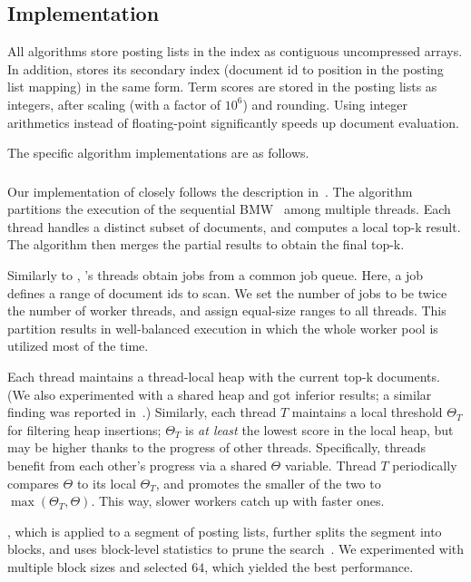 \subsection{Implementation}
\label{ssec:implementation}

All algorithms store posting lists in the index as contiguous uncompressed arrays. In addition, {\pRA} stores 
its secondary index (document id to position in the posting list mapping) in the same form. 
Term scores are stored in the posting lists as integers, after scaling (with a factor of $10^6$) and rounding. 
Using integer arithmetics instead of floating-point significantly speeds up document evaluation. 

The specific algorithm implementations are as follows.

\subsubsection{\pBMW}
Our implementation of {\pBMW} closely follows the description in~\cite{rojas2013distributing}. The algorithm partitions the execution of the 
sequential BMW~\cite{Ding:2011} among multiple threads. Each thread handles a distinct subset of documents, and computes a local top-k 
result. The algorithm then merges the partial results to obtain the final top-k. 

Similarly to \alg, \pBMW's threads obtain jobs from a common job queue. Here, a job defines a range of document ids to scan. 
We set the number of jobs to be twice the number of worker threads, and assign equal-size ranges to all threads.  
This partition results in well-balanced execution in which the whole worker pool is utilized 
most of the time. 

Each thread maintains a thread-local heap with the current top-k documents. (We also experimented with a shared heap and 
got inferior results; a similar finding was reported in~\cite{rojas2013distributing}.)
Similarly, each thread $T$ maintains a local threshold $\Theta_T$ for filtering heap insertions; 
$\Theta_T$ is \emph{at least} the lowest score in the local heap, but may be higher thanks to the progress of other threads.  
Specifically, threads benefit from each other's progress via a shared $\Theta$ variable. 
Thread $T$ periodically compares $\Theta$ to its local $\Theta_T$, and promotes the smaller of the two to $\max(\Theta_T, \Theta)$. 
This way,  slower workers catch up with  faster ones.

\pBMW, which is applied to a segment of posting lists, further splits the segment into blocks, and uses block-level
statistics to prune the search~\cite{Ding:2011}. We experimented with multiple block sizes and selected $64$, 
which yielded the best performance.

